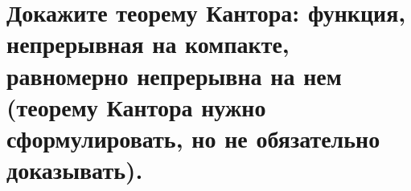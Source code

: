 \section{Докажите теорему Кантора: функция, непрерывная на компакте, равномерно непрерывна на нем (теорему Кантора нужно сформулировать, но не обязательно доказывать).}